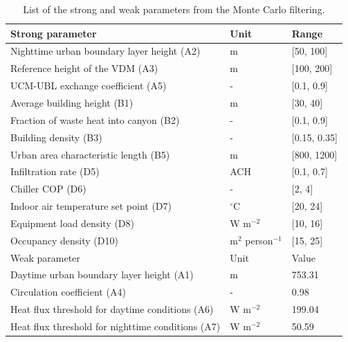 \begin{table}[!h]
\footnotesize
\begin{center}
\caption{List of the strong and weak parameters from the Monte Carlo filtering.}
\begin{tabular}{lll}
\toprule
Strong parameter                                  & Unit        & Range            \\ \hline
Nighttime urban boundary layer height (A2)        & m           & {[}50, 100{]}    \\
Reference height of the VDM (A3)                  & m           & {[}100, 200{]}   \\
UCM-UBL exchange coefficient (A5)                 & -           & {[}0.1, 0.9{]}   \\
Average building height (B1)                      & m           & {[}30, 40{]}     \\
Fraction of waste heat into canyon (B2)           & -           & {[}0.1, 0.9{]}   \\
Building density (B3)                             & -           & {[}0.15, 0.35{]} \\
Urban area characteristic length (B5)             & m           & {[}800, 1200{]}  \\
Infiltration rate (D5)                            & ACH         & {[}0.1, 0.7{]}   \\
Chiller COP (D6)                                  & -           & {[}2, 4{]}       \\
Indoor air temperature set point (D7)             & $^{\circ}$C          & {[}20, 24{]}     \\
Equipment load density (D8)                       & W m$^{-2}$       & {[}10, 16{]}     \\
Occupancy density (D10)                           & m$^2$ person$^{-1}$ & {[}15, 25{]}     \\ \hline
\rule{0pt}{2.75ex}Weak parameter                                    & Unit        & Value            \\ \hline
Daytime urban boundary layer height (A1)          & m           & 753.31           \\
Circulation coefficient (A4)                      & -           & 0.98             \\
Heat flux threshold for daytime conditions (A6)   & W m$^{-2}$       & 199.04           \\
Heat flux threshold for nighttime conditions (A7) & W m$^{-2}$       & 50.59            \\

\end{tabular}
\end{center}
\end{table}
